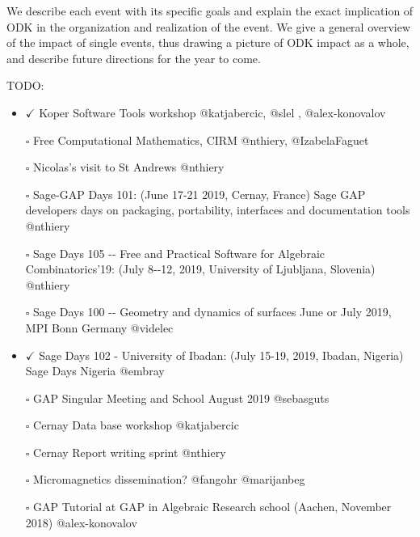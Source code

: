 We describe each event with its specific goals and explain the exact
implication of ODK in the organization and realization of the event. We
give a general overview of the impact of single events, thus drawing a
picture of ODK impact as a whole, and describe future directions for the
year to come.

TODO:

\begin{itemize}
\tightlist
\item
  \(\checkmark\) Koper Software Tools workshop @katjabercic, @slel ,
  @alex-konovalov
\item[$\square$]
  Free Computational Mathematics, CIRM @nthiery, @IzabelaFaguet
\item[$\square$]
  Nicolas's visit to St Andrews @nthiery
\item[$\square$]
  Sage-GAP Days 101: (June 17-21 2019, Cernay, France) Sage GAP
  developers days on packaging, portability, interfaces and
  documentation tools @nthiery
\item[$\square$]
  Sage Days 105 -\/- Free and Practical Software for Algebraic
  Combinatorics'19: (July 8-\/-12, 2019, University of Ljubljana,
  Slovenia) @nthiery
\item[$\square$]
  Sage Days 100 -\/- Geometry and dynamics of surfaces June or July
  2019, MPI Bonn Germany @videlec
\item
  \(\checkmark\) Sage Days 102 - University of Ibadan: (July 15-19,
  2019, Ibadan, Nigeria) Sage Days Nigeria @embray
\item[$\square$]
  GAP Singular Meeting and School August 2019 @sebasguts
\item[$\square$]
  Cernay Data base workshop @katjabercic
\item[$\square$]
  Cernay Report writing sprint @nthiery
\item[$\square$]
  Micromagnetics dissemination? @fangohr @marijanbeg
\item[$\square$]
  GAP Tutorial at GAP in Algebraic Research school (Aachen, November
  2018) @alex-konovalov
\end{itemize}
